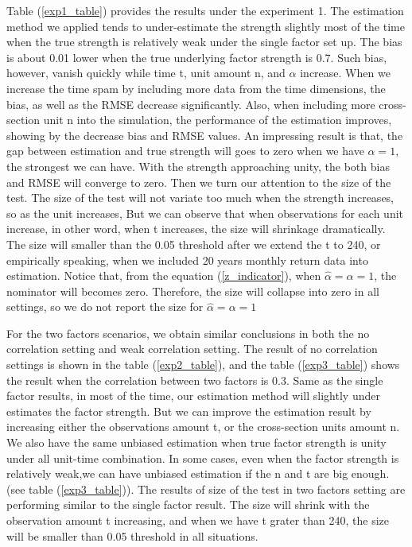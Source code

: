 Table (\ref{exp1_table}) provides the results under the experiment 1.
The estimation method we applied tends to under-estimate the strength slightly most of the time when the true strength is relatively weak under the single factor set up.
The bias is about 0.01 lower when the true underlying factor strength is 0.7.
Such bias, however, vanish quickly while time t, unit amount n, and  $\alpha$ increase.
When we increase the time spam by including more data from the time dimensions, the bias, as well as the RMSE decrease significantly.
Also, when including more cross-section unit n into the simulation, the performance of the estimation improves, showing by the decrease bias and RMSE values.
An impressing result is that, the gap between estimation and true strength will goes to zero when we have $\alpha = 1$, the strongest we can have.
With the strength approaching unity, the both bias and RMSE will converge to zero.
Then we turn our attention to the size of the test.
The size of the test will not variate too much when the strength increases, so as the unit increases,
But we can observe that when observations for each unit increase, in other word, when t increases, the size will shrinkage dramatically.
The size will smaller than the 0.05 threshold after we extend the t to 240, or empirically  speaking, when we included 20 years monthly return data into estimation.
Notice that, from the equation (\ref{z_indicator}), when $\hat{\alpha} = \alpha = 1$, the nominator will becomes zero.
Therefore, the size will collapse into zero in all settings, so we do not report the size for $\hat{\alpha} = \alpha = 1$

For the two factors scenarios, we obtain similar conclusions in both the no correlation setting and weak correlation setting.
The result of no correlation settings is shown in the table (\ref{exp2_table}), and the table (\ref{exp3_table}) shows the result when the correlation between two factors is 0.3.
Same as the single factor results, in most of the time, our estimation method will slightly under estimates the factor strength. 
But we can improve the estimation result by increasing either the observations amount t, or the cross-section units amount n.
We also have the same unbiased estimation when true factor strength is unity under all unit-time combination.
In some cases, even when the factor strength is relatively weak,we can have unbiased estimation if the n and t are big enough. (see table (\ref{exp3_table})).
The results of size of the test in two factors setting are performing similar to the single factor result. 
The size will shrink with the observation amount t increasing, and when we have t grater than 240, the size will be smaller than 0.05 threshold in all situations.

